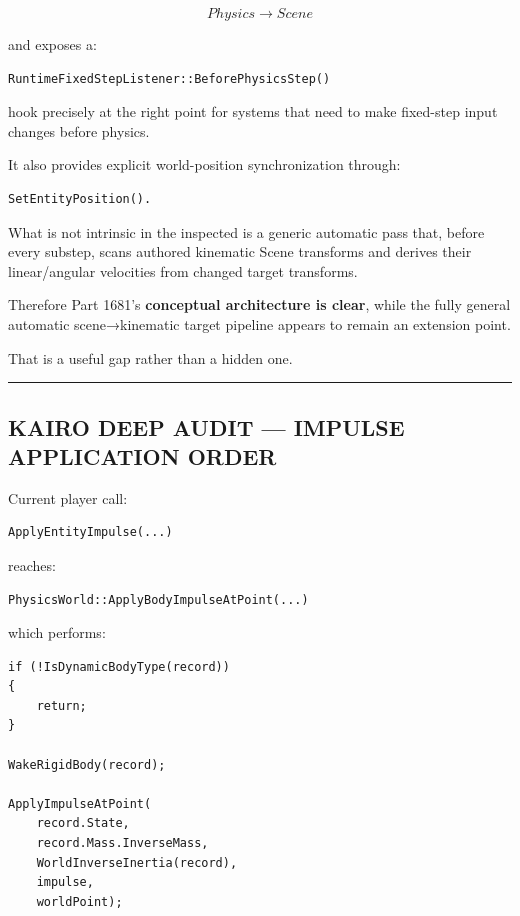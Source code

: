 \[
Physics\rightarrow Scene
\]

and exposes a:

\begin{verbatim}
RuntimeFixedStepListener::BeforePhysicsStep()
\end{verbatim}

hook precisely at the right point for systems that need to make fixed-step input changes before physics.

It also provides explicit world-position synchronization through:

\begin{verbatim}
SetEntityPosition().
\end{verbatim}

What is not intrinsic in the inspected  is a generic automatic pass that, before every substep, scans authored kinematic Scene transforms and derives their linear/angular velocities from changed target transforms.

Therefore Part 1681's \textbf{conceptual architecture is clear}, while the fully general automatic scene→kinematic target pipeline appears to remain an extension point.

That is a useful gap rather than a hidden one.

\begin{center}\rule{0.5\linewidth}{0.5pt}\end{center}

\subsection{KAIRO DEEP AUDIT --- IMPULSE APPLICATION ORDER}\label{06-engine-ii-ch037-kairo-deep-audit-impulse-application-order}

\hypertarget{06-engine-ii-ch037-kairo-deep-audit-impulse-application-order}{}

Current player call:

\begin{verbatim}
ApplyEntityImpulse(...)
\end{verbatim}

reaches:

\begin{verbatim}
PhysicsWorld::ApplyBodyImpulseAtPoint(...)
\end{verbatim}

which performs:

\begin{verbatim}
if (!IsDynamicBodyType(record))
{
    return;
}

WakeRigidBody(record);

ApplyImpulseAtPoint(
    record.State,
    record.Mass.InverseMass,
    WorldInverseInertia(record),
    impulse,
    worldPoint);
\end{verbatim}

